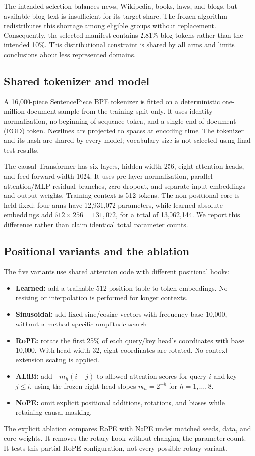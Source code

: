 \documentclass[conference]{IEEEtran}
\begin{document}
The intended selection balances news, Wikipedia, books, laws, and blogs, but available blog text is insufficient for its target share. The frozen algorithm redistributes this shortage among eligible groups without replacement. Consequently, the selected manifest contains 2.81\% blog tokens rather than the intended 10\%. This distributional constraint is shared by all arms and limits conclusions about less represented domains.

\subsection{Shared tokenizer and model}
A 16,000-piece SentencePiece BPE tokenizer is fitted on a deterministic one-million-document sample from the training split only. It uses identity normalization, no beginning-of-sequence token, and a single end-of-document (EOD) token. Newlines are projected to spaces at encoding time. The tokenizer and its hash are shared by every model; vocabulary size is not selected using final test results.

The causal Transformer has six layers, hidden width 256, eight attention heads, and feed-forward width 1024. It uses pre-layer normalization, parallel attention/MLP residual branches, zero dropout, and separate input embeddings and output weights. Training context is 512 tokens. The non-positional core is held fixed: four arms have 12,931,072 parameters, while learned absolute embeddings add $512\times256=131,072$, for a total of 13,062,144. We report this difference rather than claim identical total parameter counts.

\subsection{Positional variants and the ablation}
The five variants use shared attention code with different positional hooks:
\begin{itemize}
\item \textbf{Learned:} add a trainable 512-position table to token embeddings. No resizing or interpolation is performed for longer contexts.
\item \textbf{Sinusoidal:} add fixed sine/cosine vectors with frequency base 10,000, without a method-specific amplitude search.
\item \textbf{RoPE:} rotate the first 25\% of each query/key head's coordinates with base 10,000. With head width 32, eight coordinates are rotated. No context-extension scaling is applied.
\item \textbf{ALiBi:} add $-m_h(i-j)$ to allowed attention scores for query $i$ and key $j\leq i$, using the frozen eight-head slopes $m_h=2^{-h}$ for $h=1,\ldots,8$.
\item \textbf{NoPE:} omit explicit positional additions, rotations, and biases while retaining causal masking.
\end{itemize}
The explicit ablation compares RoPE with NoPE under matched seeds, data, and core weights. It removes the rotary hook without changing the parameter count. It tests this partial-RoPE configuration, not every possible rotary variant.
\end{document}

